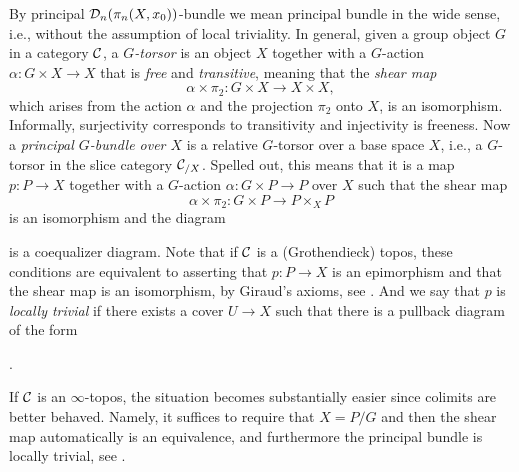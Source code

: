 By principal $\mathcal{D}_n(\pi_n(X,x_0))$-bundle we mean principal bundle in the wide sense,
i.e., without the assumption of local triviality.
In general, given a group object $G$ in a category $\mathcal{C}$,
a \emph{$G$-torsor} is an object $X$ together with a $G$-action $\alpha\colon G\times X\to X$
that is \emph{free} and \emph{transitive}, meaning that the \emph{shear map}
\[
    \alpha\times\pi_2\colon G\times X\to X\times X,
\]
which arises from the action $\alpha$ and the projection $\pi_2$ onto $X$, is an isomorphism.
Informally, surjectivity corresponds to transitivity and injectivity is freeness.
Now a \emph{principal $G$-bundle over $X$} is a relative $G$-torsor over a base space $X$,
i.e., a $G$-torsor in the slice category $\mathcal{C}_{/X}$.
Spelled out, this means that it is a map $p\colon P\to X$ together with a $G$-action
$\alpha\colon G\times P\to P$ over $X$ such that the shear map
\[
    \alpha\times\pi_2\colon G\times P\to P\times_X P
\]
is an isomorphism and the diagram
\begin{center}
\end{center}
is a coequalizer diagram.
Note that if $\mathcal{C}$ is a (Grothendieck) topos,
these conditions are equivalent to asserting that $p\colon P\to X$ is an epimorphism
and that the shear map is an isomorphism, by Giraud's axioms, see \cite[Appendix]{MacLane1994}.
And we say that $p$ is \emph{locally trivial} if there exists a cover $U\to X$ such that
there is a pullback diagram of the form
\begin{center}
.
\end{center}
If $\mathcal{C}$ is an $\infty$-topos, the situation becomes substantially easier
since colimits are better behaved.
Namely, it suffices to require that $X = P/G$
and then the shear map automatically is an equivalence,
and furthermore the principal bundle is locally trivial, see \cite{Nikolaus2014}.

